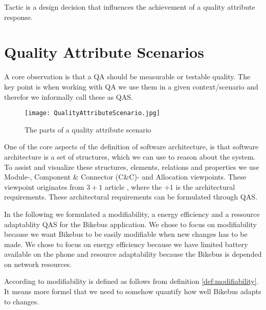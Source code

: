 \begin{defi}
Tactic is a design decision that influences the achievement of a quality attribute response. 
\label{def:tactic}
\end{defi}

\section{Quality Attribute Scenarios}

A core observation is that a QA should be measurable or testable quality. The key point is when working with QA we use them in a given context/scenario and therefor we informally call these as QAS.\\



\begin{figure}[H]
\centering
\texttt{[image: QualityAttributeScenario.jpg]}

\caption{The parts of a quality attribute scenario}
\label{fig:Quality_Attribute_Scenario}
\end{figure}






One of the core aspects of the definition of software architecture, is that software architecture is a set of structures, which we can use to reason about the system. To assist and visualize these structures, elements, relations and properties we use Module-, Component \& Connector (C\&C)- and Allocation viewpoints. These viewpoint originates from $3+1$ article \cite{3+1}, where the $+1$ is the architectural requirements. These architectural requirements can be formulated through QAS.


In the following we formulated a modifiability, a energy efficiency and a ressource adaptablity QAS for the Bikebus application. We chose to focus on modifiability because we want Bikebus to be easily modifiable when new changes has to be made. We chose to focus on energy efficiency because we have limited battery available on the phone and resource adaptability because the Bikebus is depended on network resources.

According to \cite{Bass} modifiability is defined as follows from definition \ref{def:modifiability}. It means more formel that we need to somehow quantify how well Bikebus adapts to changes.

